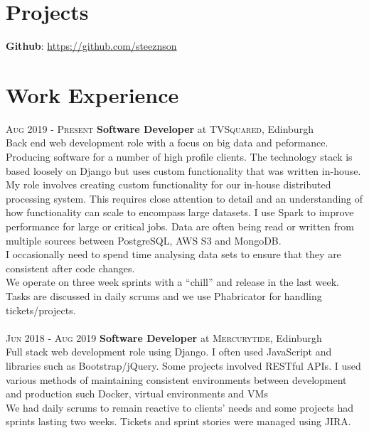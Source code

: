 \documentclass[14pt, a4paper]{extarticle}
\begin{document}
\begin{multicols}{2}
\section{Projects}
\noindent\textbf{Github}: \url{https://github.com/steeznson}

\columnbreak
\section{Work Experience}
\noindent\textsc{Aug 2019 - Present} \textbf{Software Developer}
at \textsc{TVSquared}, Edinburgh\\
Back end web development role with a focus on big data and peformance. Producing software for a number of high profile clients. The technology stack is based loosely on Django but uses custom functionality that was written in-house.\\ 
My role involves creating custom functionality for our in-house distributed processing system. This requires close attention to detail and an understanding of how functionality can scale to encompass large datasets. I use Spark to improve performance for large or critical jobs. Data are often being read or written from multiple sources between PostgreSQL, AWS S3 and MongoDB.\\
I occasionally need to spend time analysing data sets to ensure that they are consistent after code changes.\\
We operate on three week sprints with a ``chill'' and release in the last week.  Tasks are discussed in daily scrums and we use Phabricator for handling tickets/projects.\\\\
\noindent\textsc{Jun 2018 - Aug 2019} \textbf{Software Developer}
at \textsc{Mercurytide}, Edinburgh\\
Full stack web development role using Django. I often used JavaScript and libraries such as Bootstrap/jQuery. Some projects involved RESTful APIs. I used various methods of maintaining consistent environments between development and production such Docker, virtual environments and VMs\\
We had daily scrums to remain reactive to clients' needs and some projects had sprints lasting two weeks. Tickets and sprint stories were managed using JIRA.\\
\end{multicols}
\end{document}
